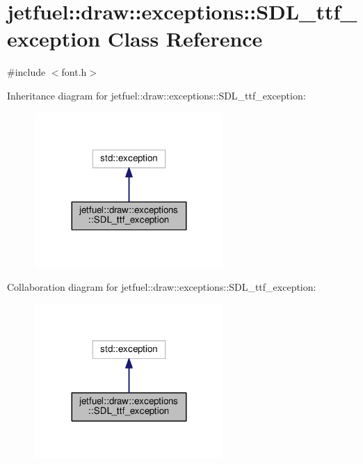 \hypertarget{classjetfuel_1_1draw_1_1exceptions_1_1SDL__ttf__exception}{}\section{jetfuel\+:\+:draw\+:\+:exceptions\+:\+:S\+D\+L\+\_\+ttf\+\_\+exception Class Reference}
\label{classjetfuel_1_1draw_1_1exceptions_1_1SDL__ttf__exception}


{\ttfamily \#include $<$font.\+h$>$}



Inheritance diagram for jetfuel\+:\+:draw\+:\+:exceptions\+:\+:S\+D\+L\+\_\+ttf\+\_\+exception\+:\nopagebreak
\begin{figure}[H]
\begin{center}
\leavevmode
\includegraphics[width=203pt]{classjetfuel_1_1draw_1_1exceptions_1_1SDL__ttf__exception__inherit__graph}
\end{center}
\end{figure}


Collaboration diagram for jetfuel\+:\+:draw\+:\+:exceptions\+:\+:S\+D\+L\+\_\+ttf\+\_\+exception\+:\nopagebreak
\begin{figure}[H]
\begin{center}
\leavevmode
\includegraphics[width=203pt]{classjetfuel_1_1draw_1_1exceptions_1_1SDL__ttf__exception__coll__graph}
\end{center}
\end{figure}
